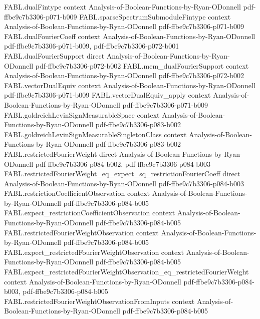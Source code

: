 \begin{theorem}
\proofstep
  {FABL.dualFintype}
  {context}
  {Analysis-of-Boolean-Functions-by-Ryan-ODonnell}
  {pdf-ffbe9c7b3306-p071-b009}
\proofstep
  {FABL.sparseSpectrumSubmoduleFintype}
  {context}
  {Analysis-of-Boolean-Functions-by-Ryan-ODonnell}
  {pdf-ffbe9c7b3306-p071-b009}
\proofstep
  {FABL.dualFourierCoeff}
  {context}
  {Analysis-of-Boolean-Functions-by-Ryan-ODonnell}
  {pdf-ffbe9c7b3306-p071-b009,
    pdf-ffbe9c7b3306-p072-b001}
\proofstep
  {FABL.dualFourierSupport}
  {direct}
  {Analysis-of-Boolean-Functions-by-Ryan-ODonnell}
  {pdf-ffbe9c7b3306-p072-b002}
\proofstep
  {FABL.mem_dualFourierSupport}
  {context}
  {Analysis-of-Boolean-Functions-by-Ryan-ODonnell}
  {pdf-ffbe9c7b3306-p072-b002}
\proofstep
  {FABL.vectorDualEquiv}
  {context}
  {Analysis-of-Boolean-Functions-by-Ryan-ODonnell}
  {pdf-ffbe9c7b3306-p071-b009}
\proofstep
  {FABL.vectorDualEquiv_apply}
  {context}
  {Analysis-of-Boolean-Functions-by-Ryan-ODonnell}
  {pdf-ffbe9c7b3306-p071-b009}
\proofstep
  {FABL.goldreichLevinSignMeasurableSpace}
  {context}
  {Analysis-of-Boolean-Functions-by-Ryan-ODonnell}
  {pdf-ffbe9c7b3306-p083-b002}
\proofstep
  {FABL.goldreichLevinSignMeasurableSingletonClass}
  {context}
  {Analysis-of-Boolean-Functions-by-Ryan-ODonnell}
  {pdf-ffbe9c7b3306-p083-b002}
\proofstep
  {FABL.restrictedFourierWeight}
  {direct}
  {Analysis-of-Boolean-Functions-by-Ryan-ODonnell}
  {pdf-ffbe9c7b3306-p084-b002,
    pdf-ffbe9c7b3306-p084-b003}
\proofstep
  {FABL.restrictedFourierWeight_eq_expect_sq_restrictionFourierCoeff}
  {direct}
  {Analysis-of-Boolean-Functions-by-Ryan-ODonnell}
  {pdf-ffbe9c7b3306-p084-b003}
\proofstep
  {FABL.restrictionCoefficientObservation}
  {context}
  {Analysis-of-Boolean-Functions-by-Ryan-ODonnell}
  {pdf-ffbe9c7b3306-p084-b005}
\proofstep
  {FABL.expect_restrictionCoefficientObservation}
  {context}
  {Analysis-of-Boolean-Functions-by-Ryan-ODonnell}
  {pdf-ffbe9c7b3306-p084-b005}
\proofstep
  {FABL.restrictedFourierWeightObservation}
  {context}
  {Analysis-of-Boolean-Functions-by-Ryan-ODonnell}
  {pdf-ffbe9c7b3306-p084-b005}
\proofstep
  {FABL.expect_restrictedFourierWeightObservation}
  {context}
  {Analysis-of-Boolean-Functions-by-Ryan-ODonnell}
  {pdf-ffbe9c7b3306-p084-b005}
\proofstep
  {FABL.expect_restrictedFourierWeightObservation_eq_restrictedFourierWeight}
  {context}
  {Analysis-of-Boolean-Functions-by-Ryan-ODonnell}
  {pdf-ffbe9c7b3306-p084-b003,
    pdf-ffbe9c7b3306-p084-b005}
\proofstep
  {FABL.restrictedFourierWeightObservationFromInputs}
  {context}
  {Analysis-of-Boolean-Functions-by-Ryan-ODonnell}
  {pdf-ffbe9c7b3306-p084-b005}
\proofstep

\end{theorem}

